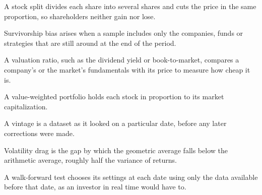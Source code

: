 \begin{keyterms}
\begin{description}[leftmargin=0pt, itemsep=0pt, parsep=0pt, topsep=0pt, font=\normalfont\bfseries\color{FEMaroon}]
  \item[Stock split.] A stock split divides each share into several shares and cuts the price in the same proportion, so shareholders neither gain nor lose.
  \item[Survivorship bias.] Survivorship bias arises when a sample includes only the companies, funds or strategies that are still around at the end of the period.
  \item[Valuation ratio.] A valuation ratio, such as the dividend yield or book-to-market, compares a company's or the market's fundamentals with its price to measure how cheap it is.
  \item[Value-weighted.] A value-weighted portfolio holds each stock in proportion to its market capitalization.
  \item[Vintage.] A vintage is a dataset as it looked on a particular date, before any later corrections were made.
  \item[Volatility drag.] Volatility drag is the gap by which the geometric average falls below the arithmetic average, roughly half the variance of returns.
  \item[Walk-forward test.] A walk-forward test chooses its settings at each date using only the data available before that date, as an investor in real time would have to.
\end{description}
\end{keyterms}
